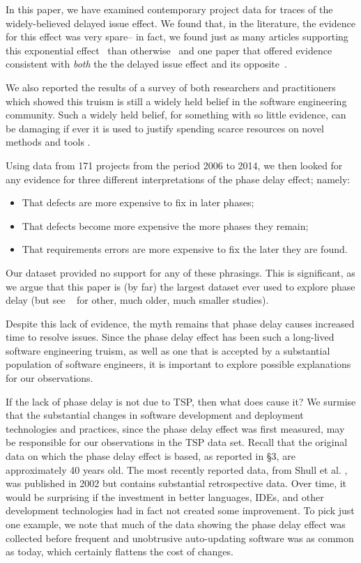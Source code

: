 \documentclass{sig-alternate}
\newcommand{\bi}{\begin{itemize}}%
\newcommand{\ei}{\end{itemize}}
\begin{document}
In this paper, we have examined contemporary project data for traces of
the widely-believed delayed issue effect.
We found that, in the literature, the evidence for this effect was very spare--
in fact, we found
just as many articles supporting this  exponential effect~\cite{Boehm76,Boehm81,teck,Fagan76,Stephenson76}
than otherwise~\cite{Clutterbuck09,Clutterbuck09,Boehm80} and one paper that
offered evidence consistent with {\em both}
the the delayed issue effect and its opposite~\cite{shull02}.

We  also  reported the results of a survey of both researchers and practitioners which showed this truism is still a widely held belief in the software engineering community. Such a widely
held belief, for something with so little evidence, can be damaging if ever it is used
to justify spending scarce resources on novel  methods and tools .

Using data from 171 projects from the period 2006 to 2014, we then looked for any evidence
for three different interpretations of the phase delay effect; namely:
\bi
\item
That defects are more expensive to fix in later phases; 
\item
That defects become more expensive the more phases they remain; 
\item
That requirements errors are more expensive to fix the later they are found. 
\ei
Our dataset provided no support for any of these phrasings. 
This is significant, as we argue that this paper is (by far)    the largest dataset ever used to explore phase delay (but see ~\cite{Boehm80,Clutterbuck09,Shull02,Royce98} 
for other, much older, much smaller studies).


 


Despite this lack of evidence, the myth remains that phase delay causes increased time to resolve issues.
 Since the phase delay effect has been such a long-lived software engineering truism, as well as one that is accepted by a substantial population of software engineers, it is important to explore possible explanations for our observations.
 

If the lack of phase delay is not due to TSP, then what does cause it?
We surmise that the substantial changes in software development and deployment technologies and practices, since the phase delay effect was first measured, may be responsible for our observations in the TSP data set. Recall that the original data on which the phase delay effect is based, as reported in \S3, are approximately 40 years old. The most recently reported data, from Shull et al. \cite{Shull02}, was published in 2002 but contains substantial retrospective data. Over time, it would be surprising if the investment in better languages, IDEs, and other development technologies had in fact not created some improvement. To pick just one example, we note that much of the data showing the phase delay effect was collected before frequent and unobtrusive auto-updating software was as common as today, which certainly flattens the cost of changes.
\end{document}
